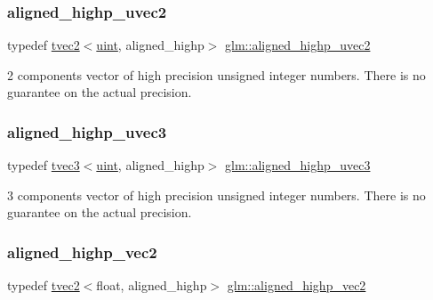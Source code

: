 \subsubsection{\texorpdfstring{aligned\+\_\+highp\+\_\+uvec2}{aligned\_highp\_uvec2}}
{\footnotesize\ttfamily typedef \hyperlink{structglm_1_1tvec2}{tvec2}$<$\hyperlink{group__core__precision_ga4fd29415871152bfb5abd588334147c8}{uint}, aligned\+\_\+highp$>$ \hyperlink{group__gtc__type__aligned_gadbe09d1af82957ec00a3baaa89120f1e}{glm\+::aligned\+\_\+highp\+\_\+uvec2}}

2 components vector of high precision unsigned integer numbers. There is no guarantee on the actual precision. \mbox{\label{group__gtc__type__aligned_gac7b68f6ca0c6a536c9692bfb885a0006}} 
\subsubsection{\texorpdfstring{aligned\+\_\+highp\+\_\+uvec3}{aligned\_highp\_uvec3}}
{\footnotesize\ttfamily typedef \hyperlink{structglm_1_1tvec3}{tvec3}$<$\hyperlink{group__core__precision_ga4fd29415871152bfb5abd588334147c8}{uint}, aligned\+\_\+highp$>$ \hyperlink{group__gtc__type__aligned_gac7b68f6ca0c6a536c9692bfb885a0006}{glm\+::aligned\+\_\+highp\+\_\+uvec3}}

3 components vector of high precision unsigned integer numbers. There is no guarantee on the actual precision. \mbox{\label{group__gtc__type__aligned_ga5873b18cca2602c92bb077e663e29bbd}} 
\subsubsection{\texorpdfstring{aligned\+\_\+highp\+\_\+vec2}{aligned\_highp\_vec2}}
{\footnotesize\ttfamily typedef \hyperlink{structglm_1_1tvec2}{tvec2}$<$float, aligned\+\_\+highp$>$ \hyperlink{group__gtc__type__aligned_ga5873b18cca2602c92bb077e663e29bbd}{glm\+::aligned\+\_\+highp\+\_\+vec2}}

